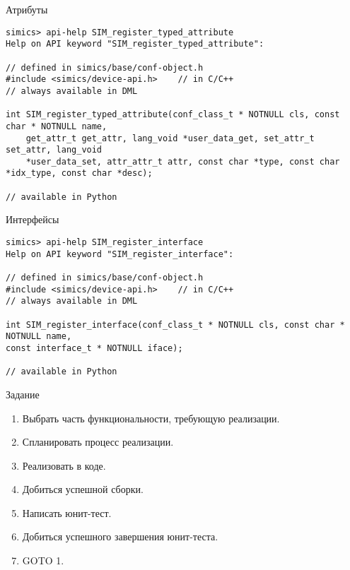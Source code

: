\documentclass{beamer}
\begin{document}
\begin{frame}[fragile]{Атрибуты}

\begin{tiny}
\begin{verbatim}
simics> api-help SIM_register_typed_attribute
Help on API keyword "SIM_register_typed_attribute":

// defined in simics/base/conf-object.h
#include <simics/device-api.h>    // in C/C++
// always available in DML

int SIM_register_typed_attribute(conf_class_t * NOTNULL cls, const char * NOTNULL name, 
	get_attr_t get_attr, lang_void *user_data_get, set_attr_t set_attr, lang_void
    *user_data_set, attr_attr_t attr, const char *type, const char *idx_type, const char *desc);

// available in Python
\end{verbatim}
\end{tiny}

\end{frame}

\begin{frame}[fragile]{Интерфейсы}

\begin{tiny}
\begin{verbatim}
simics> api-help SIM_register_interface
Help on API keyword "SIM_register_interface":

// defined in simics/base/conf-object.h
#include <simics/device-api.h>    // in C/C++
// always available in DML

int SIM_register_interface(conf_class_t * NOTNULL cls, const char * NOTNULL name, 
const interface_t * NOTNULL iface);

// available in Python
\end{verbatim}
\end{tiny}
\end{frame}

\begin{frame}{Задание}

\begin{enumerate}
\item Выбрать часть функциональности, требующую реализации.
\item Спланировать процесс реализации.
\item Реализовать в коде.
\item Добиться успешной сборки.
\item Написать юнит-тест.
\item Добиться успешного завершения юнит-теста.
\item GOTO 1.
\end{enumerate}

\end{frame}
\end{document}
